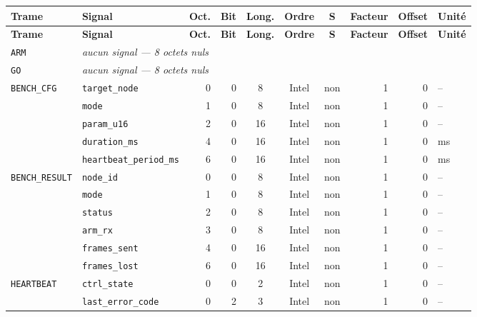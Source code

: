 
\begin{longtable}{llrrcccrrl}
\toprule
\textbf{Trame} & \textbf{Signal} & \textbf{Oct.} & \textbf{Bit} & \textbf{Long.} & \textbf{Ordre} & \textbf{S} & \textbf{Facteur} & \textbf{Offset} & \textbf{Unité} \\
\midrule
\endfirsthead
\toprule
\textbf{Trame} & \textbf{Signal} & \textbf{Oct.} & \textbf{Bit} & \textbf{Long.} & \textbf{Ordre} & \textbf{S} & \textbf{Facteur} & \textbf{Offset} & \textbf{Unité} \\
\midrule
\endhead
\bottomrule
\endfoot
\texttt{ARM} & \multicolumn{9}{l}{\itshape aucun signal — 8 octets nuls} \\
\texttt{GO} & \multicolumn{9}{l}{\itshape aucun signal — 8 octets nuls} \\
\texttt{BENCH\_CFG} & \texttt{target\_node} & 0 & 0 & 8 & Intel & non & 1 & 0 & -- \\
 & \texttt{mode} & 1 & 0 & 8 & Intel & non & 1 & 0 & -- \\
 & \texttt{param\_u16} & 2 & 0 & 16 & Intel & non & 1 & 0 & -- \\
 & \texttt{duration\_ms} & 4 & 0 & 16 & Intel & non & 1 & 0 & ms \\
 & \texttt{heartbeat\_period\_ms} & 6 & 0 & 16 & Intel & non & 1 & 0 & ms \\
\addlinespace
\texttt{BENCH\_RESULT} & \texttt{node\_id} & 0 & 0 & 8 & Intel & non & 1 & 0 & -- \\
 & \texttt{mode} & 1 & 0 & 8 & Intel & non & 1 & 0 & -- \\
 & \texttt{status} & 2 & 0 & 8 & Intel & non & 1 & 0 & -- \\
 & \texttt{arm\_rx} & 3 & 0 & 8 & Intel & non & 1 & 0 & -- \\
 & \texttt{frames\_sent} & 4 & 0 & 16 & Intel & non & 1 & 0 & -- \\
 & \texttt{frames\_lost} & 6 & 0 & 16 & Intel & non & 1 & 0 & -- \\
\addlinespace
\texttt{HEARTBEAT} & \texttt{ctrl\_state} & 0 & 0 & 2 & Intel & non & 1 & 0 & -- \\
 & \texttt{last\_error\_code} & 0 & 2 & 3 & Intel & non & 1 & 0 & -- \\

\end{longtable}
